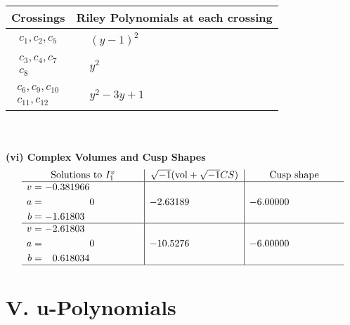 \documentclass[1p]{elsarticle_modified}
\theoremstyle{definition}
\newcommand{\I}{\sqrt{-1}}
\begin{document}
\begin{tabular}{m{50pt}|m{274pt}}
Crossings & \hspace{64pt}Riley Polynomials at each crossing \\
\hline $$\begin{aligned}c_{1},c_{2},c_{5}\end{aligned}$$&$\begin{aligned}
&(y-1)^2
\end{aligned}$\\
\hline $$\begin{aligned}c_{3},c_{4},c_{7}\\c_{8}\end{aligned}$$&$\begin{aligned}
&y^2
\end{aligned}$\\
\hline $$\begin{aligned}c_{6},c_{9},c_{10}\\c_{11},c_{12}\end{aligned}$$&$\begin{aligned}
&y^2-3 y+1
\end{aligned}$\\
\hline
\end{tabular}\\~\\
\newpage\flushleft \textbf{(vi) Complex Volumes and Cusp Shapes}
$$\begin{array}{c|c|c}  
\text{Solutions to }I^v_{1}& \I (\text{vol} + \sqrt{-1}CS) & \text{Cusp shape}\\
 \hline 
\begin{aligned}
v &= -0.381966\phantom{ +0.000000I} \\
a &= \phantom{-0.000000 } 0 \\
b &= -1.61803\phantom{ +0.000000I}\end{aligned}
 & -2.63189\phantom{ +0.000000I} & -6.00000\phantom{ +0.000000I} \\ \hline\begin{aligned}
v &= -2.61803\phantom{ +0.000000I} \\
a &= \phantom{-0.000000 } 0 \\
b &= \phantom{-}0.618034\phantom{ +0.000000I}\end{aligned}
 & -10.5276\phantom{ +0.000000I} & -6.00000\phantom{ +0.000000I}\\
 \hline 
 \end{array}$$\newpage
\newpage\renewcommand{\arraystretch}{1}
\centering \section*{ V. u-Polynomials}
\end{document}
